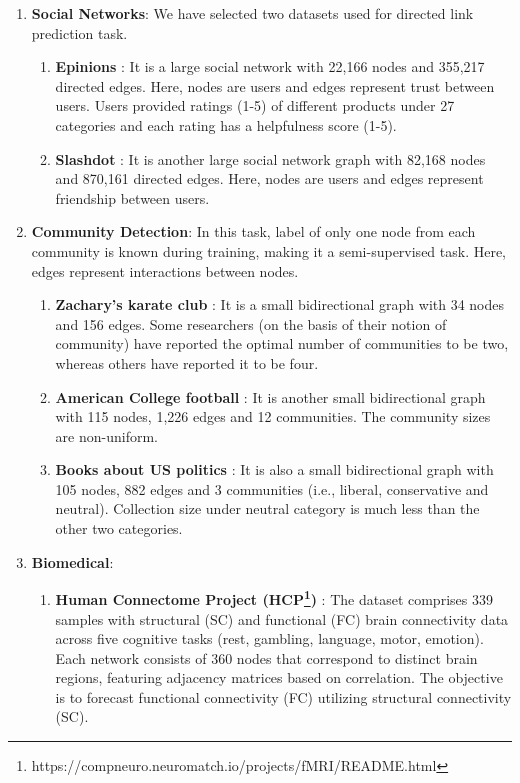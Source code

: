 \begin{enumerate}
\item \label{data:socailnet}\textbf{Social Networks}: We have selected two datasets used for directed link prediction task.
\begin{enumerate}
\item \label{data:epi}\textbf{Epinions}
\cite{wang2020edge2vec}\cite{Tang-etal12c}: It is a large social network with 22,166 nodes and 355,217 directed edges. Here, nodes are users and edges represent trust between users. Users provided ratings (1-5) of different products under 27 categories and each rating has a helpfulness score (1-5). 
\item \label{data:slash}\textbf{Slashdot}
\cite{wang2020edge2vec}\cite{leskovec2009community}: It is another large social network graph with 82,168 nodes and 870,161 directed edges. Here, nodes are users and edges represent friendship between users.
\end{enumerate}

\item \label{data:community}\textbf{Community Detection}: In this task, label of only one node from each community is known during training, making it a semi-supervised task. Here, edges represent interactions between nodes.
\begin{enumerate}
\item \label{data:zach}\textbf{Zachary’s karate club} \cite{zachary1977information}\cite{lu2018community}\cite{DBLP:journals/debu/HamiltonYL17}\cite{cai2019community}: It is a small bidirectional graph with 34 nodes and 156 edges. Some researchers (on the basis of their notion of community) have reported the optimal number of communities to be two, whereas others have reported it to be four.
\item \label{data:acf}\textbf{American College football} \cite{girvan2002community}\cite{lu2018community}\cite{cai2019community}: It is another small bidirectional graph with 115 nodes, 1,226 edges and 12 communities. The community sizes are non-uniform.
\item \label{data:books}\textbf{Books about US politics} \cite{krebs2004books}\cite{cai2019community}: It is also a small bidirectional graph with 105 nodes, 882 edges and 3 communities (i.e., liberal, conservative and neutral). Collection size under neutral category is much less than the other two categories.
\end{enumerate}

\item \label{data:biomed}\textbf{Biomedical}:
\begin{enumerate}
\item \label{data:hcp}\textbf{Human Connectome Project (HCP\footnote{https://compneuro.neuromatch.io/projects/fMRI/README.html})} \cite{van2013wu}: The dataset comprises 339 samples with structural (SC) and functional (FC) brain connectivity data across five cognitive tasks (rest, gambling, language, motor, emotion). Each network consists of 360 nodes that correspond to distinct brain regions, featuring adjacency matrices based on correlation. The objective is to forecast functional connectivity (FC) utilizing structural connectivity (SC).


\end{enumerate}
\end{enumerate}
